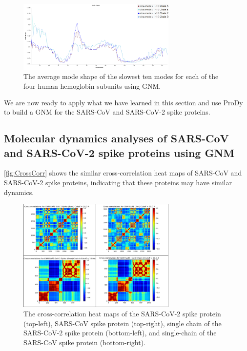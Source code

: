 \begin{figure}[h]
	\centering
	\mySfFamily
	\includegraphics[width = 0.7\textwidth]{../images/hemoglobin_mode_shape_avg.png}
	\caption{The average mode shape of the slowest ten modes for each of the four human hemoglobin subunits using GNM.}
	\label{fig:hemoglobin_mode_shape_avg}
\end{figure}

We are now ready to apply what we have learned in this section and use ProDy to build a GNM for the SARS-CoV and SARS-CoV-2 spike proteins. 

\FloatBarrier
{}
\subsection{Molecular dynamics analyses of SARS-CoV and SARS-CoV-2 spike proteins using GNM}

\autoref{fig:CrossCorr} shows the similar cross-correlation heat maps of SARS-CoV and SARS-CoV-2 spike proteins, indicating that these proteins may have similar dynamics.

\begin{figure}[h]
	\centering
	\mySfFamily
	\includegraphics[width = 0.7\textwidth]{../images/CrossCorr.png}
	\caption{The cross-correlation heat maps of the SARS-CoV-2 spike protein (top-left), SARS-CoV spike protein (top-right), single chain of the SARS-CoV-2 spike protein (bottom-left), and single-chain of the SARS-CoV spike protein (bottom-right).}
	\label{fig:CrossCorr}
\end{figure}

